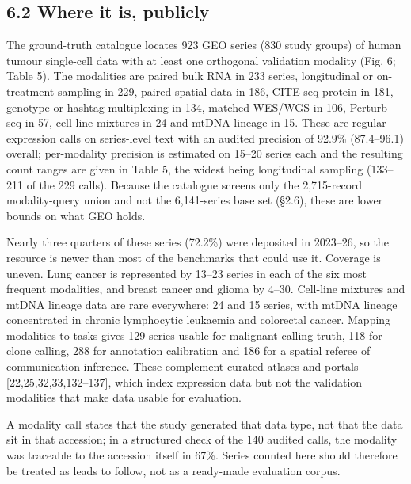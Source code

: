 \documentclass{article}
\begin{document}
\subsection{6.2 Where it is, publicly}\label{where-it-is-publicly}

The ground-truth catalogue locates 923 GEO series (830 study groups) of
human tumour single-cell data with at least one orthogonal validation
modality (Fig. 6; Table 5). The modalities are paired bulk RNA in 233
series, longitudinal or on-treatment sampling in 229, paired spatial
data in 186, CITE-seq protein in 181, genotype or hashtag multiplexing
in 134, matched WES/WGS in 106, Perturb-seq in 57, cell-line mixtures in
24 and mtDNA lineage in 15. These are regular-expression calls on
series-level text with an audited precision of 92.9\% (87.4--96.1)
overall; per-modality precision is estimated on 15--20 series each and
the resulting count ranges are given in Table 5, the widest being
longitudinal sampling (133--211 of the 229 calls). Because the catalogue
screens only the 2,715-record modality-query union and not the
6,141-series base set (§2.6), these are lower bounds on what GEO holds.

Nearly three quarters of these series (72.2\%) were deposited in
2023--26, so the resource is newer than most of the benchmarks that
could use it. Coverage is uneven. Lung cancer is represented by 13--23
series in each of the six most frequent modalities, and breast cancer
and glioma by 4--30. Cell-line mixtures and mtDNA lineage data are rare
everywhere: 24 and 15 series, with mtDNA lineage concentrated in chronic
lymphocytic leukaemia and colorectal cancer. Mapping modalities to tasks
gives 129 series usable for malignant-calling truth, 118 for clone
calling, 288 for annotation calibration and 186 for a spatial referee of
communication inference. These complement curated atlases and portals
{[}22,25,32,33,132--137{]}, which index expression data but not the
validation modalities that make data usable for evaluation.

A modality call states that the study generated that data type, not that
the data sit in that accession; in a structured check of the 140 audited
calls, the modality was traceable to the accession itself in 67\%.
Series counted here should therefore be treated as leads to follow, not
as a ready-made evaluation corpus.
\end{document}
